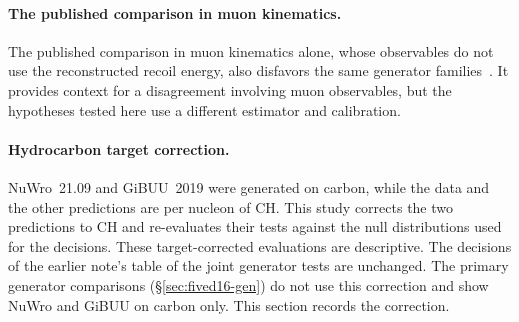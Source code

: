 \paragraph{The published comparison in muon kinematics.} The published comparison in muon kinematics alone, whose observables do not use the reconstructed recoil energy, also disfavors the same generator families~\cite{MINERvA:2021owq}. It provides context for a disagreement involving muon observables, but the hypotheses tested here use a different estimator and calibration.

\paragraph{Hydrocarbon target correction.} NuWro~21.09 and GiBUU~2019 were generated on carbon, while the data and the other predictions are per nucleon of CH. This study corrects the two predictions to CH and re-evaluates their tests against the null distributions used for the decisions. These target-corrected evaluations are descriptive. The decisions of the earlier note's table of the joint generator tests are unchanged. The primary generator comparisons (\S\ref{sec:fived16-gen}) do not use this correction and show NuWro and GiBUU on carbon only. This section records the correction.

